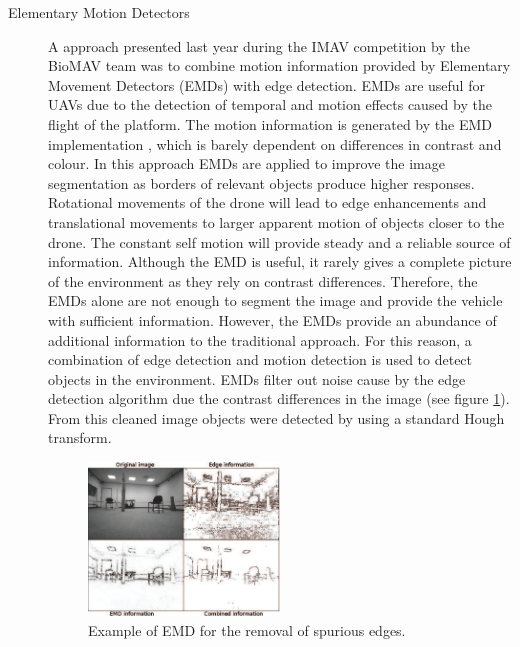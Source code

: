 \documentclass[a4paper]{article}
\begin{document}
\begin{description}
\item[Elementary Motion Detectors] A approach presented last year during the IMAV competition by the BioMAV team \cite{Gerke2011} was to combine motion information provided by Elementary Movement Detectors (EMDs) with edge detection. EMDs are useful for UAVs due to the detection of temporal and motion effects caused by the flight of the platform. The motion information is generated by the EMD implementation \cite{Zhang2008}, which is barely dependent on differences in contrast and colour. In this approach EMDs are applied to improve the image segmentation as borders of relevant objects produce higher responses. Rotational movements of the drone will lead to edge enhancements and translational movements to larger apparent motion of objects closer to the drone. The constant self motion will provide steady and a reliable source of information. Although the EMD is useful, it rarely gives a complete picture of the environment as they rely on contrast differences. Therefore, the EMDs alone are not enough to segment the image and provide the vehicle with sufficient information. However, the EMDs provide an abundance of additional information to the traditional approach. For this reason, a combination of edge detection and motion detection is used to detect objects in the environment. EMDs filter out noise cause by the edge detection algorithm due the contrast differences in the image (see figure \ref{biomav}). From this cleaned image objects were detected by using a standard Hough transform.

\begin{figure}[!ht]
\centering
\includegraphics[width=0.5\textwidth]{images/gerke2011.png}
\caption{Example \cite{Gerke2011} of EMD for the removal of spurious edges.}
\label{biomav}
\end{figure}

\newpage


\end{description}
\end{document}
